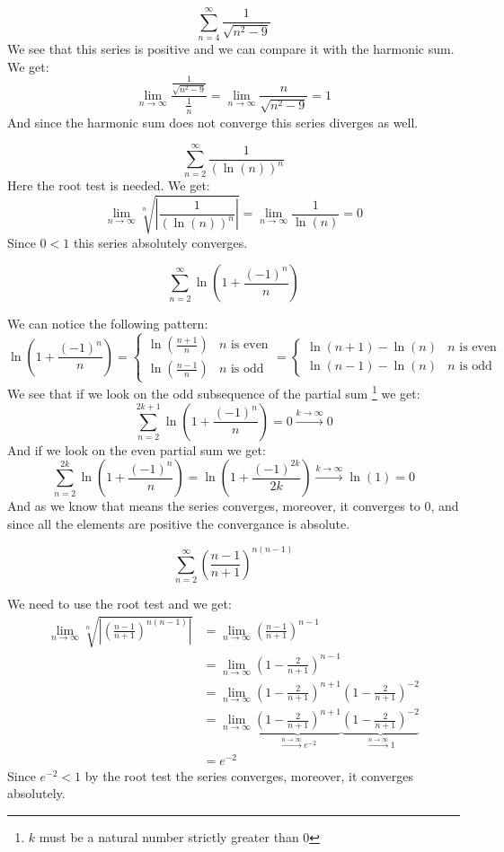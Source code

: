 \documentclass{article}
\theoremstyle{plain}
\begin{document}
	\newpage
	
	\[
		\sum_{n=4}^{\infty}{\frac{1}{\sqrt{n^2-9}}}
	\]
	We see that this series is positive and we can compare it with the 
	harmonic sum. We get:
	\[
	\lim_{n\to\infty}{\frac{\frac{1}{\sqrt{n^2-9}}}{\frac{1}{n}}} = 
	\lim_{n\to\infty}{\frac{n}{\sqrt{n^2-9}}} = 1
	\]
	And since the harmonic sum does not converge this series diverges as well.
	
	\newpage
	
	\[
		\sum_{n=2}^{\infty}{\frac{1}{(\ln(n))^n}}
	\]
	Here the root test is needed. We get:
	\[
	\lim_{n\to\infty}{\sqrt[n]{\left\vert\frac{1}{(\ln(n))^n}\right\vert}} = 
	\lim_{n\to\infty}{\frac{1}{\ln(n)}} = 0
	\]
	Since $0 < 1$ this series absolutely converges.
	
	\newpage
	
	\[
		\sum_{n=2}^{\infty}{\ln\left(1+\frac{(-1)^n}{n}\right)}
	\]
	
	We can notice the following pattern:
	\[
	\ln\left(1+\frac{(-1)^n}{n}\right) = \begin{cases}
		 \ln\left(\frac{n+1}{n}\right) & \text{$n$ is even} \\
		 \ln\left(\frac{n-1}{n}\right) & \text{$n$ is odd}
	\end{cases} = \begin{cases}
		 \ln(n+1)-\ln(n) & \text{$n$ is even} \\
		 \ln(n-1)-\ln(n) & \text{$n$ is odd}
	\end{cases}
	\]
	We see that if we look on the odd subsequence of the partial sum
	\footnote{$k$ must be a natural number strictly greater than $0$}
	we get:
	\[
		\sum_{n=2}^{2k+1}{\ln\left(1+\frac{(-1)^n}{n}\right)} = 0 
		\xrightarrow{k\to\infty} 0
	\]
	And if we look on the even partial sum we get:
	\[
		\sum_{n=2}^{2k}{\ln\left(1+\frac{(-1)^n}{n}\right)} = 
		\ln\left(1+\frac{(-1)^{2k}}{2k}\right) \xrightarrow{k\to\infty} \ln(1)
		= 0
	\]
	And as we know that means the series converges, moreover, it converges
	to $0$, and since all the elements are positive the convergance is 
	absolute.
	
	\newpage
	
	\[
		\sum_{n=2}^{\infty}{\left(\frac{n-1}{n+1}\right)^{n(n-1)}}
	\]
	
	We need to use the root test and we get:
	\begin{align*}
	\lim_{n\to\infty}{\sqrt[n]{
	\left\vert\left(\frac{n-1}{n+1}\right)^{n(n-1)}\right\vert}} &= 
	\lim_{n\to\infty}{\left(\frac{n-1}{n+1}\right)^{n-1}} \\ &= 
	\lim_{n\to\infty}{\left(1 - \frac{2}{n+1}\right)^{n-1}} \\ &= 
	\lim_{n\to\infty}{\left(1 - \frac{2}{n+1}\right)^{n+1}\left(1 - \frac{2}
	{n+1}\right)^{-2}} \\ &=
	\lim_{n\to\infty}{\underbrace{\left(1 - \frac{2}{n+1}\right)^{n+1}
	}_{\xrightarrow{n\to\infty}e^{-2}}\underbrace{\left(1 - \frac{2}
	{n+1}\right)^{-2}}_{\xrightarrow{n\to\infty}1}} \\ &= e^{-2}
	\end{align*}
	Since $e^{-2} < 1$ by the root test the series converges, moreover, it 
	converges absolutely.
	
\end{document}
